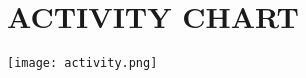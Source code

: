 \documentclass{article}
\begin{document}
\begin{figure}[htbp]
\begin{center} 
\setcounter{section}{4}
\section{ACTIVITY CHART}
\bigskip

\texttt{[image: activity.png]}
\label{fig:label1}




\end{center}
\end{figure}
\end{document}
